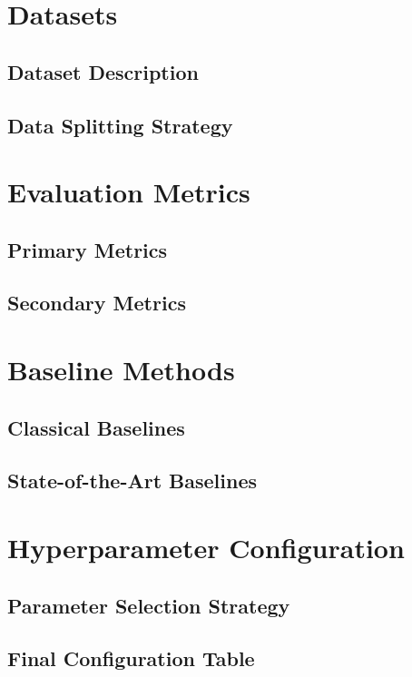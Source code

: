 \section{Datasets}
\label{sec:datasets}

    \subsection{Dataset Description}
    \label{subsec:dataset-description}

    \subsection{Data Splitting Strategy}
    \label{subsec:data-splitting}

\section{Evaluation Metrics}
\label{sec:metrics}

    \subsection{Primary Metrics}
    \label{subsec:primary-metrics}

    \subsection{Secondary Metrics}
    \label{subsec:secondary-metrics}

\section{Baseline Methods}
\label{sec:baselines}

    \subsection{Classical Baselines}
    \label{subsec:classical-baselines}

    \subsection{State-of-the-Art Baselines}
    \label{subsec:sota-baselines}

\section{Hyperparameter Configuration}
\label{sec:hyperparameters}

    \subsection{Parameter Selection Strategy}
    \label{subsec:param-selection}

    \subsection{Final Configuration Table}
    \label{subsec:config-table}